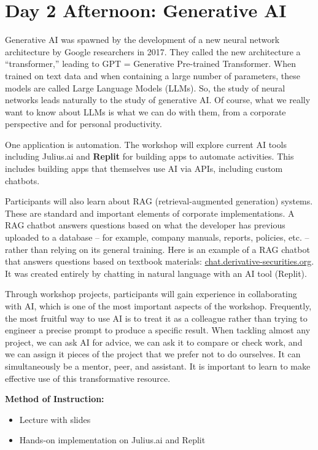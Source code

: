 \documentclass[11pt]{scrartcl}
\begin{document}
\section*{Day 2 Afternoon: Generative AI}

Generative AI was spawned by the development of a new neural network architecture by Google researchers in 2017. They called the new architecture a ``transformer,'' leading to GPT = Generative Pre-trained Transformer. When trained on text data and when containing a large number of parameters, these models are called Large Language Models (LLMs). So, the study of neural networks leads naturally to the study of generative AI. Of course, what we really want to know about LLMs is what we can do with them, from a corporate perspective and for personal productivity.

One application is automation. The workshop will explore current AI tools including Julius.ai and \textbf{Replit} for building apps to automate activities. This includes building apps that themselves use AI via APIs, including custom chatbots.

Participants will also learn about RAG (retrieval-augmented generation) systems. These are standard and important elements of corporate implementations. A RAG chatbot answers questions based on what the developer has previous uploaded to a database -- for example, company manuals, reports, policies, etc. -- rather than relying on its general training. Here is an example of a RAG chatbot that answers questions based on textbook materials: \href{https://chat.derivative-securities.org}{chat.derivative-securities.org}. It was created entirely by chatting in natural language with an AI tool (Replit).

Through workshop projects, participants will gain experience in collaborating with AI, which is one of the most important aspects of the workshop. Frequently, the most fruitful way to use AI is to treat it as a colleague rather than trying to engineer a precise prompt to produce a specific result. When tackling almost any project, we can ask AI for advice, we can ask it to compare or check work, and we can assign it pieces of the project that we prefer not to do ourselves. It can simultaneously be a mentor, peer, and assistant. It is important to learn to make effective use of this transformative resource.

\vspace{\baselineskip}
\noindent\textbf{Method of Instruction:}

\begin{itemize}
\item Lecture with slides
\item Hands-on implementation on Julius.ai and Replit
\end{itemize}
\end{document}
